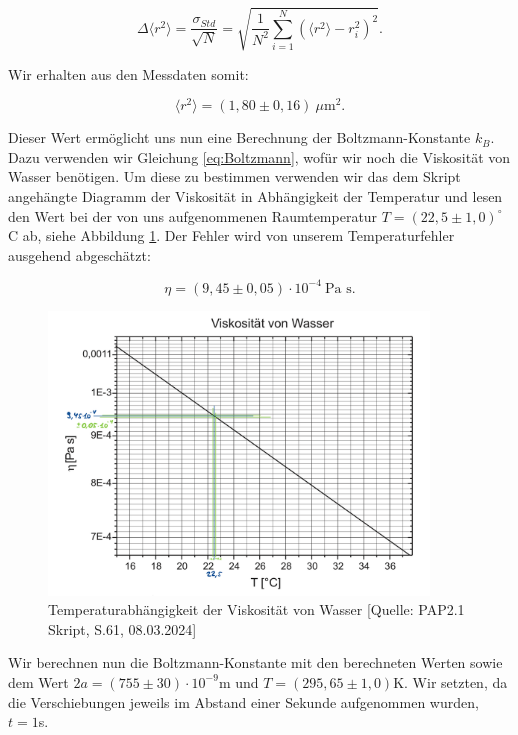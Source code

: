 \documentclass{article}
\begin{document}
\begin{equation}
    \Delta \langle r^2 \rangle = \frac{\sigma_{Std}}{\sqrt{N}} = \sqrt{\frac{1}{N^2} \sum_{i=1}^N (\langle r^2 \rangle - r^2_i)^2}.
\end{equation}

Wir erhalten aus den Messdaten somit:

\begin{equation}
    \langle r^2 \rangle = (1,80 \pm 0,16) \ \mu \text{m}^2.
\end{equation}

Dieser Wert ermöglicht uns nun eine Berechnung der Boltzmann-Konstante $k_B$. Dazu verwenden wir Gleichung \ref{eq:Boltzmann}, wofür wir noch die Viskosität von Wasser benötigen. Um diese zu bestimmen verwenden wir das dem Skript angehängte Diagramm der Viskosität in Abhängigkeit der Temperatur und lesen den Wert bei der von uns aufgenommenen Raumtemperatur $T = (22,5 \pm 1,0)^\circ$C ab, siehe Abbildung \ref{fig:viskos}. Der Fehler wird von unserem Temperaturfehler ausgehend abgeschätzt:

\begin{equation}
    \eta = (9,45 \pm 0,05) \cdot 10^{-4} \ \text{Pa s}.
\end{equation}

\begin{figure}[!h]
    \centering
    \includegraphics[width=0.9\textwidth]{graphics/viskositaet.png}
    \caption{Temperaturabhängigkeit der Viskosität von Wasser [Quelle: PAP2.1 Skript, S.61, 08.03.2024]}
    \label{fig:viskos}
\end{figure}

\newpage
Wir berechnen nun die Boltzmann-Konstante mit den berechneten Werten sowie dem Wert $2a = (755 \pm 30) \cdot 10^{-9}$m und $T = (295,65 \pm 1,0)$K. Wir setzten, da die Verschiebungen jeweils im Abstand einer Sekunde aufgenommen wurden, $t=1$s.
\end{document}
